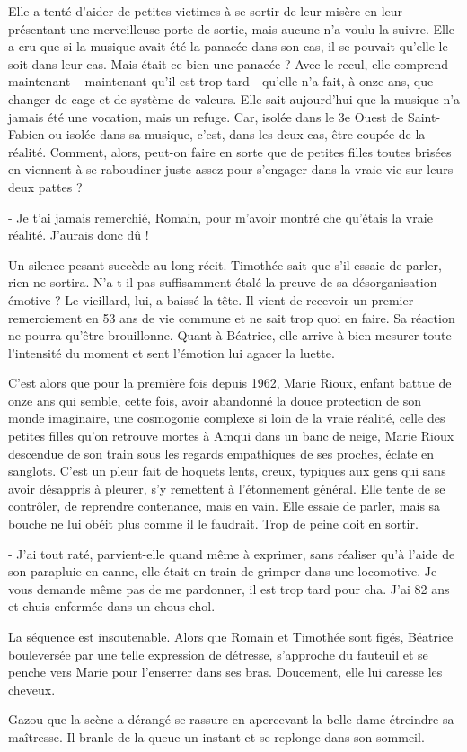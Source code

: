 Elle a tenté d’aider de petites victimes à se sortir de leur misère en leur présentant une merveilleuse porte de sortie, mais aucune n’a voulu la suivre. Elle a cru que si la musique avait été la panacée dans son cas, il se pouvait qu’elle le soit dans leur cas. Mais était-ce bien une panacée ? Avec le recul, elle comprend maintenant – maintenant qu’il est trop tard - qu’elle n’a fait, à onze ans, que changer de cage et de système de valeurs. Elle sait aujourd’hui que la musique n’a jamais été une vocation, mais un refuge. Car, isolée dans le 3e Ouest de Saint-Fabien ou isolée dans sa musique, c’est, dans les deux cas, être coupée de la réalité. Comment, alors, peut-on faire en sorte que de petites filles toutes brisées en viennent à se raboudiner juste assez pour s’engager dans la vraie vie sur leurs deux pattes ?

- Je t’ai jamais remerchié, Romain, pour m’avoir montré che qu’étais la vraie réalité. J’aurais donc dû !

Un silence pesant succède au long récit. Timothée sait que s’il essaie de parler, rien ne sortira. N’a-t-il pas suffisamment étalé la preuve de sa désorganisation émotive ? Le vieillard, lui, a baissé la tête. Il vient de recevoir un premier remerciement en 53 ans de vie commune et ne sait trop quoi en faire. Sa réaction ne pourra qu’être brouillonne. Quant à Béatrice, elle arrive à bien mesurer toute l’intensité du moment et sent l’émotion lui agacer la luette.

C’est alors que pour la première fois depuis 1962, Marie Rioux, enfant battue de onze ans qui semble, cette fois, avoir abandonné la douce protection de son monde imaginaire, une cosmogonie complexe si loin de la vraie réalité, celle des petites filles qu’on retrouve mortes à Amqui dans un banc de neige, Marie Rioux descendue de son train sous les regards empathiques de ses proches, éclate en sanglots. C’est un pleur fait de hoquets lents, creux, typiques aux gens qui sans avoir désappris à pleurer, s’y remettent à l’étonnement général. Elle tente de se contrôler, de reprendre contenance, mais en vain. Elle essaie de parler, mais sa bouche ne lui obéit plus comme il le faudrait. Trop de peine doit en sortir.

- J’ai tout raté, parvient-elle quand même à exprimer, sans réaliser qu’à l’aide de son parapluie en canne, elle était en train de grimper dans une locomotive. Je vous demande même pas de me pardonner, il est trop tard pour cha. J’ai 82 ans et chuis enfermée dans un chous-chol.

La séquence est insoutenable. Alors que Romain et Timothée sont figés, Béatrice bouleversée par une telle expression de détresse, s’approche du fauteuil et se penche vers Marie pour l’enserrer dans ses bras. Doucement, elle lui caresse les cheveux.

Gazou que la scène a dérangé se rassure en apercevant la belle dame étreindre sa maîtresse. Il branle de la queue un instant et se replonge dans son sommeil.